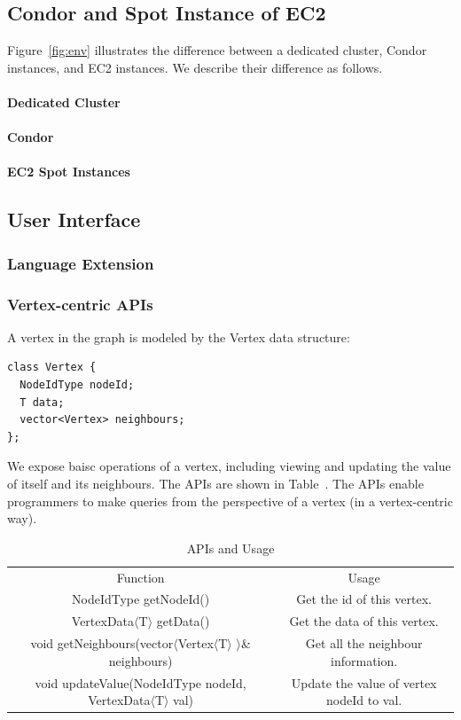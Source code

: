 \documentclass[11pt]{article}
\begin{document}
\subsection{Condor and Spot Instance of EC2}

Figure~\ref{fig:env} illustrates the difference between
a dedicated cluster, Condor instances, and EC2 instances.
We describe their difference as follows.

\paragraph*{Dedicated Cluster}


\paragraph*{Condor}


\paragraph*{EC2 Spot Instances}


\subsection{User Interface}
\subsubsection{Language Extension}

\subsubsection{Vertex-centric APIs}
A vertex in the graph is modeled by the \textsf{Vertex} data structure:
\begin{verbatim}
class Vertex {
  NodeIdType nodeId;
  T data;
  vector<Vertex> neighbours;
};
\end{verbatim}
We expose baisc operations of a vertex, including viewing and updating the 
value of itself and its neighbours. The APIs are shown in 
Table~\cite{table:api}. The APIs enable programmers to make queries 
from the perspective of a vertex (in a vertex-centric way). 
\begin{table}
  \centering
 \begin{tabular}{|c|c|}
 \hline
 \hline
 Function & Usage\\
 NodeIdType getNodeId() & Get the id of this vertex.\\
 VertexData$\langle$T$\rangle$ getData() & Get the data of this vertex.\\
 void getNeighbours(vector$\langle$Vertex$\langle$T$\rangle$ $\rangle$\& 
neighbours) & Get all the neighbour information.\\
 void updateValue(NodeIdType nodeId, VertexData$\langle$T$\rangle$ val) & Update 
the value of vertex nodeId to val.\\
 \hline
 \hline
 \end{tabular}
 \caption{APIs and Usage}
 \label{table:api}
\end{table}
\end{document}
